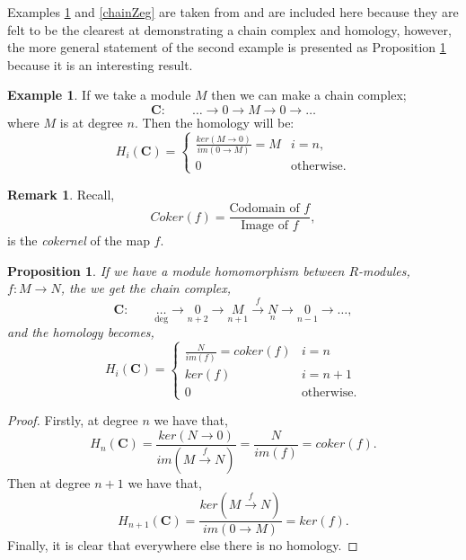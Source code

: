 \documentclass[11.5pt, twoside, a4paper, titlepage]{report}
\theoremstyle{definition}
\newtheorem{rem}[mydef]{Remark}
\newtheorem{eg}[mydef]{Example}
\theoremstyle{plain}
\newtheorem{prop}[mydef]{Proposition}
\begin{document}
Examples \ref{chainMeg} and \ref{chainZeg} are taken from \cite{CB1} and are included here because they are felt to be the clearest at demonstrating a chain complex and homology, however, the more general statement of the second example is presented as Proposition \ref{chainhomprop} because it is an interesting result.

\begin{eg}
 \label{chainMeg}
 If we take a module $M$ then we can make a chain complex;
\begin{equation*}
\mathbf{C}: \qquad \dots \xrightarrow{} 0 \xrightarrow{} M \xrightarrow{} 0 \xrightarrow{} \dots
\end{equation*}
where $M$ is at degree $n$. Then the homology will be:
\begin{equation*}
H_i(\mathbf{C})=\begin{cases}
\frac{ker(M \rightarrow 0)}{im(0 \rightarrow M)}=M & i=n,\\
0 & \text{otherwise}.
\end{cases}
\end{equation*}
\end{eg}

\begin{rem}
Recall, 
\begin{equation*}
Coker(f)= \frac{\text{Codomain of }f}{\text{Image of }f},
\end{equation*}
is the \emph{cokernel} of the map $f$.
\end{rem}

\begin{prop}  \label{chainhomprop}
If we have a module homomorphism between $R$-modules, $f: M \xrightarrow{} N$, the we get the chain complex,
\begin{equation*}
\mathbf{C}: \qquad \underset{\text{deg}}{\dots} \xrightarrow{}\underset{n+2}{0} \xrightarrow{} \underset{n+1}{M} \xrightarrow{f}\underset{n}{N} \xrightarrow{} \underset{n-1}{0} \xrightarrow{}\dots ,
\end{equation*}
and the homology becomes,
\begin{equation*}
H_i(\mathbf{C})=
\begin{cases}
\frac{N}{im(f)}=coker(f) & i=n\\
ker(f) & i=n+1\\
0 & \text{otherwise}.
\end{cases}
\end{equation*}
\end{prop}
\begin{proof}
Firstly, at degree $n$ we have that,
\begin{equation*}
H_n(\mathbf{C})=\frac{ker(N\xrightarrow{}0)}{im(M\xrightarrow{f}N)}=\frac{N}{im(f)}=coker(f).
\end{equation*}
Then at degree $n+1$ we have that,
\begin{equation*}
H_{n+1}(\mathbf{C})=\frac{ker(M\xrightarrow{f}N)}{im(0\xrightarrow{}M)}=ker(f).
\end{equation*}
Finally, it is clear that everywhere else there is no homology.
\end{proof}
\end{document}
